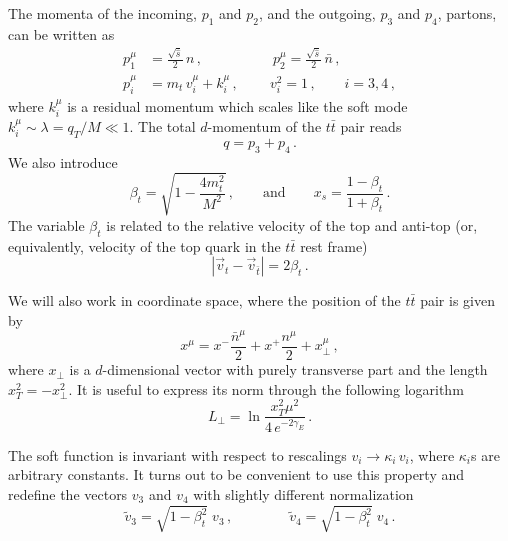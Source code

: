 \documentclass[a4paper,11pt]{article}
\newcommand{\ttbar}{\ensuremath{t \bar t}\xspace}
\newcommand{\nbar}{\ensuremath{\bar{n}}}
\numberwithin{equation}{section}
\begin{document}
The momenta of the incoming, $p_1$ and $p_2$, and the outgoing, $p_3$ and $p_4$,
partons, can be written as
%
%
\begin{subequations}
  \label{eq:external-momenta}
  \begin{align}
    \label{eq:light-momenta}
    p_{1}^\mu &= \frac{\sqrt{\hat s}}{2}\, n\,,     \quad \qquad \qquad
    p_{2}^\mu  = \frac{\sqrt{\hat s}}{2}\, \nbar\,,
    \\[0.3em]
    p_i^\mu & = m_t\, v_i^\mu + k_i^\mu\,,\qquad  \
    v_i^2 = 1\,,\qquad i=3,4\,,
    \label{eq:hq-momenta}
  \end{align}
\end{subequations}
%
where $k_i^\mu$ is a residual momentum which scales like the soft mode 
$k_i^\mu \sim \lambda = q_T/M \ll 1$.
%
The total $d$-momentum of the \ttbar pair reads
%
\begin{equation}
  q = p_3 + p_4\,.
\end{equation}
%
We also introduce 
%
\begin{equation}
  \beta_t  =  \sqrt{1-\frac{4 m_t^2}{M^2}}\,,
  \qquad
  \text{and}
  \qquad
  x_s  = \frac{1-\beta_t}{1+\beta_t}\,.
  \label{eq:beta-def}
\end{equation}
%
The variable $\beta_t$ is related to the relative velocity of the
top and anti-top (or, equivalently, velocity of the top quark in the \ttbar rest
frame)~\cite{Ferroglia:2009ii} 
%
%
\begin{equation}
  |\vec v_t - \vec v_{\bar t}| = 2 \beta_t\,.
\end{equation}

We will also work in coordinate space, where the position of the \ttbar pair is
given by 
%
\begin{equation}
  x^\mu = 
  x^- \frac{\nbar^\mu}{2} +  x^+ \frac{n^\mu}{2} + x_\perp^\mu\,,
\end{equation}
%
where $x_\perp$ is a $d$-dimensional vector with purely transverse part and the
length $x_T^2 = -x_\perp^2$.
%
It is useful to express its norm through the following logarithm
%
\begin{equation}
  L_\perp = \ln\frac{x_T^2\mu^2}{4\, e^{-2\gamma_E}}\,.
  \label{eq:LTdef}
\end{equation}

The soft function is invariant with respect to rescalings $v_i \to
\kappa_i\, v_i$, where $\kappa_i$s are arbitrary constants. It turns out to be
convenient to use this property and redefine the vectors $v_3$ and $v_4$ with
slightly different normalization
%
\begin{equation}
  \tilde v_3 = \sqrt{1-\beta_t^2}\; v_3\,,
  \qquad \qquad
  \tilde v_4 = \sqrt{1-\beta_t^2}\; v_4\,.
  \label{eq:v3v4-tilde-def}
\end{equation}
\end{document}
